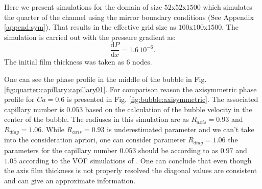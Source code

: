 \documentclass{article}
\begin{document}
Here we present simulations for the domain of size $52\mathrm{x}52\mathrm{x}1500$ which simulates
the quarter of the channel using the mirror boundary conditions (See Appendix \ref{append:sym}).
That
results in the effective grid size as $100\mathrm{x}100\mathrm{x}1500$. The simulation is carried
out with the pressure gradient as:
\begin{equation}
\frac{\mathrm{d}P}{\mathrm{d}x}=1.6\,10^{-6}.
\end{equation}
The initial film thickness was taken as $6$ nodes. 

One can see the phase profile in the middle of the bubble in
Fig.\ref{fig:quarter:capillary:capillary01}. For comparison reason the axisymmetric phase profile
for $Ca=0.6$ is presented in Fig. \ref{fig:bubble:axisymmetric}. The associated capillary number is
$0.053$ based on
the calculation of the bubble velocity in the center of the bubble. The radiuses in this simulation
are as $R_{axis}=0.93$ and $R_{diag}=1.06$. While $R_{axis}=0.93$ is underestimated parameter and
we can't take into the consideration apriori, one can consider parameter $R_{diag}=1.06$ the
parameters for the capillary number $0.053$ should be according to \citet{heil-threedim} as $0.97$
and $1.05$ according to the VOF simulations of \citet{wang-non-circular}. One can conclude that
even though the axis film thickness is not properly resolved the diagonal values are consistent and
can give an approximate information. 
\end{document}
